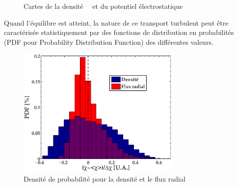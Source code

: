 \begin{refsection}
\begin{figure}[!htbp]
    \centering
    \caption{Cartes de la densité ~~et du potentiel
    électrostatique
    }
    \label{2-CartesBase}
\end{figure}

Quand l'équilibre est atteint, la nature de ce transport turbulent peut être
caractérisée statistiquement par des fonctions de distribution en probabilités
(PDF pour Probability Distribution Function) des différentes valeurs. 

 \begin{figure}[!htbp]
\centering
    \includegraphics[width=8cm]{figures/2-PDFBase.eps}
    \caption{Densité de probabilité pour la densité et le flux radial}
    \label{2-PDFBase}
\end{figure}


\end{refsection}
